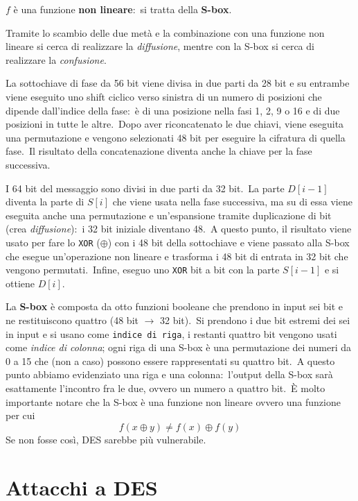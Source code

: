 \noindent $f$ è una funzione \textbf{non lineare}:\ si tratta della \textbf{S-box}.\

Tramite lo scambio delle due metà e la combinazione con una funzione non lineare si cerca di realizzare la \textit{diffusione}, mentre con la S-box si cerca di realizzare la \textit{confusione}.\

La sottochiave di fase da 56 bit viene divisa in due parti da 28 bit e su entrambe viene eseguito uno shift ciclico verso sinistra di un numero di posizioni che dipende dall'indice della fase:\ è di una posizione nella fasi 1, 2, 9 o 16 e di due posizioni in tutte le altre.\
Dopo aver riconcatenato le due chiavi, viene eseguita una permutazione e vengono selezionati 48 bit per eseguire la cifratura di quella fase.\
Il risultato della concatenazione diventa anche la chiave per la fase successiva.\

I 64 bit del messaggio sono divisi in due parti da 32 bit.\
La parte $D[i-1]$ diventa la parte di $S[i]$ che viene usata nella fase successiva, ma su di essa viene eseguita anche una permutazione e un'espansione tramite duplicazione di bit (crea \textit{diffusione}):\ i 32 bit iniziale diventano 48.\
A questo punto, il risultato viene usato per fare lo \texttt{XOR} ($\oplus$) con i 48 bit della sottochiave e viene passato alla S-box che esegue un'operazione non lineare e trasforma i 48 bit di entrata in 32 bit che vengono permutati.\
Infine, eseguo uno \texttt{XOR} bit a bit con la parte $S[i-1]$ e si ottiene $D[i]$.\

La \textbf{S-box} è composta da otto funzioni booleane che prendono in input sei bit e ne restituiscono quattro (48 bit $\rightarrow$ 32 bit).\
Si prendono i due bit estremi dei sei in input e si usano come \texttt{indice di riga}, i restanti quattro bit vengono usati come \textit{indice di colonna}; ogni riga di una S-box è una permutazione dei numeri da 0 a 15 che (non a caso) possono essere rappresentati su quattro bit.\
A questo punto abbiamo evidenziato una riga e una colonna:\ l'output della S-box sarà esattamente l'incontro fra le due, ovvero un numero a quattro bit.\
È molto importante notare che la S-box è una funzione non lineare ovvero una funzione per cui
\[f(x \oplus y) \neq f(x) \oplus f(y)\]
Se non fosse così, DES sarebbe più vulnerabile.

\section{Attacchi a DES}


